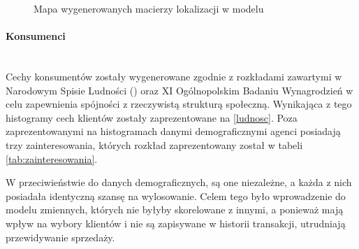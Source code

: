 \documentclass[polish, twoside, 12pt, a4paper]{article}
\theoremstyle{definition}
\theoremstyle{plain}
\theoremstyle{remark}
\begin{document}
\begin{figure}[hbt]
  \captionsetup{margin=10pt,font=small,labelfont=bf,width=.8\textwidth}

  \caption[Krótka nazwa II]{Mapa wygenerowanych macierzy lokalizacji w modelu}\label{fig:xxx}
\end{figure}

\paragraph{Konsumenci}\mbox{}\\
Cechy konsumentów zostały wygenerowane zgodnie z rozkładami zawartymi w Narodowym Spisie Ludności (\cite{GUS2011}) oraz XI Ogólnopolskim Badaniu Wynagrodzień \cite{Sedlak2013} w celu zapewnienia spójności z rzeczywistą strukturą społeczną. Wynikająca z tego histogramy cech klientów zostały zaprezentowane na \ref{ludnosc}. Poza zaprezentowanymi na histogramach danymi demograficznymi agenci posiadają trzy zainteresowania, których rozkład zaprezentowany został w tabeli \ref{tab:zainteresowania}. 

W przeciwieństwie do danych demograficznych, są one niezależne, a każda z nich posiadała identyczną szansę na wylosowanie. Celem tego było wprowadzenie do modelu zmiennych, których nie byłyby skorelowane z innymi, a ponieważ mają wpływ na wybory klientów i nie są zapisywane w historii transakcji, utrudniają przewidywanie sprzedaży.
\end{document}
